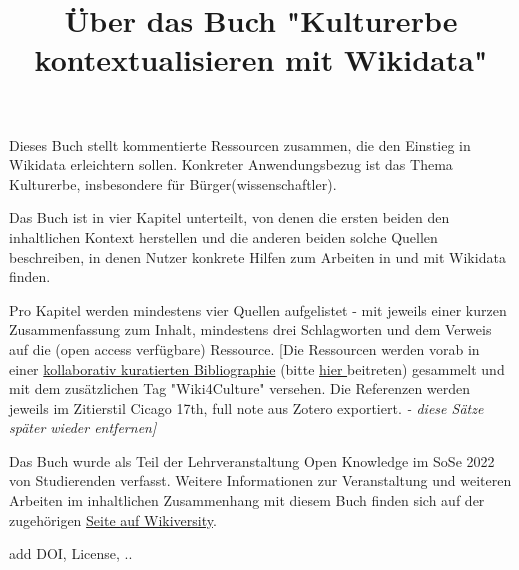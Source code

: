 \documentclass{article}
\begin{document}
\title{Über das Buch "Kulturerbe kontextualisieren mit Wikidata"}

\maketitle





Dieses Buch stellt kommentierte Ressourcen zusammen, die den Einstieg in Wikidata erleichtern sollen. Konkreter Anwendungsbezug ist das Thema Kulturerbe, insbesondere für Bürger(wissenschaftler). 


Das Buch ist in vier Kapitel unterteilt, von denen die ersten beiden den inhaltlichen Kontext herstellen und die anderen beiden solche Quellen beschreiben, in denen Nutzer konkrete Hilfen zum Arbeiten in und mit Wikidata finden.


Pro Kapitel werden mindestens vier Quellen aufgelistet - mit jeweils einer kurzen Zusammenfassung zum Inhalt, mindestens drei Schlagworten und dem Verweis auf die (open access verfügbare) Ressource. [Die Ressourcen werden vorab in einer \href{https://www.zotero.org/groups/1838445/generation_r/collections/DND4FSHT}{kollaborativ kuratierten Bibliographie} (bitte \href{https://www.zotero.org/groups/1838445/generation_r}{hier }beitreten) gesammelt und mit dem zusätzlichen Tag "Wiki4Culture" versehen. Die Referenzen werden jeweils im Zitierstil Cicago 17th, full note aus Zotero exportiert.\emph{ - diese Sätze später wieder entfernen]}


Das Buch wurde als Teil der Lehrveranstaltung Open Knowledge im SoSe 2022 von Studierenden verfasst. Weitere Informationen zur Veranstaltung und weiteren Arbeiten im inhaltlichen Zusammenhang mit diesem Buch finden sich auf der zugehörigen \href{https://de.wikiversity.org/wiki/OpenKnowledge22}{Seite auf Wikiversity}.


add DOI, License, ..
\end{document}

